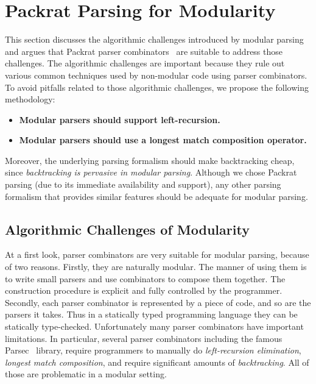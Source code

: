 \section{Packrat Parsing for Modularity}\label{sec:packrat}

This section discusses the algorithmic challenges introduced by
modular parsing and argues that Packrat parser combinators~\cite{Ford2002}
are suitable to address those challenges. The algorithmic challenges
are important because they rule out various common techniques
used by non-modular code using parser combinators.
To avoid pitfalls related to those algorithmic challenges,
we propose the following methodology:

\begin{itemize}[leftmargin=*]

\item \textbf{Modular parsers should support left-recursion.}

\item \textbf{Modular parsers should use a longest match composition operator.}

\end{itemize}

Moreover, the underlying parsing formalism should make backtracking
cheap, since \emph{backtracking is pervasive in modular parsing}.
Although we chose Packrat parsing (due to its immediate availability
and support), any other parsing formalism that provides similar
features should be adequate for modular parsing.

\subsection{Algorithmic Challenges of Modularity}\label{subsec:challenges}
At a first look, parser combinators are very suitable for modular parsing, because of two reasons. Firstly, they are naturally modular. The manner of using them is to write small parsers and use combinators to compose them together. The construction procedure is explicit and fully controlled by the programmer. Secondly, each parser combinator is represented by a piece of code, and so are the parsers it takes. Thus in a statically typed programming language they can be statically type-checked.
Unfortunately many parser combinators have important limitations.
In particular, several parser combinators including the famous Parsec~\cite{Leijen2001} library, require
programmers to manually do \textit{left-recursion elimination}, \textit{longest match composition}, and
require significant amounts of \textit{backtracking}. All of those are
problematic in a modular setting.

